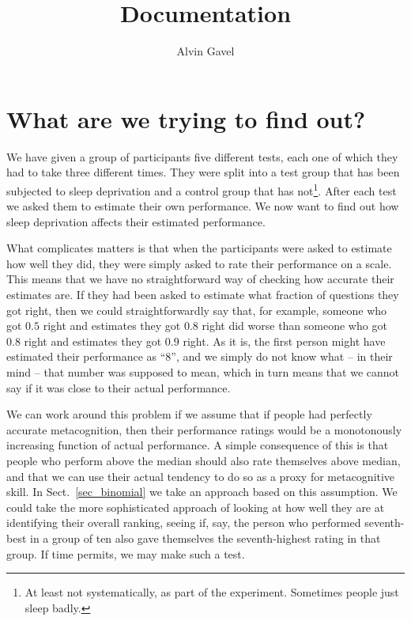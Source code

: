 \documentclass[10pt, twoside,a4paper]{article}
\title{Documentation}
\author{Alvin Gavel}
\date{}
\begin{document}
\maketitle

\tableofcontents

\newpage
\section{What are we trying to find out?}
We have given a group of participants five different tests, each one of which they had to take three different times. They were split into a test group that has been subjected to sleep deprivation and a control group that has not\footnote{At least not systematically, as part of the experiment. Sometimes people just sleep badly.}. After each test we asked them to estimate their own performance. We now want to find out how sleep deprivation affects their estimated performance.

What complicates matters is that when the participants were asked to estimate how well they did, they were simply asked to rate their performance on a scale. This means that we have no straightforward way of checking how accurate their estimates are. If they had been asked to estimate what fraction of questions they got right, then we could straightforwardly say that, for example, someone who got $0.5$ right and estimates they got $0.8$ right did worse than someone who got $0.8$ right and estimates they got $0.9$ right. As it is, the first person might have estimated their performance as ``8'', and we simply do not know what -- in their mind -- that number was supposed to mean, which in turn means that we cannot say if it was close to their actual performance.

We can work around this problem if we assume that if people had perfectly accurate metacognition, then their performance ratings would be a monotonously increasing function of actual performance. A simple consequence of this is that people who perform above the median should also rate themselves above median, and that we can use their actual tendency to do so as a proxy for metacognitive skill. In Sect.~\ref{sec_binomial} we take an approach based on this assumption. We could take the more sophisticated approach of looking at how well they are at identifying their overall ranking, seeing if, say, the person who performed seventh-best in a group of ten also gave themselves the seventh-highest rating in that group. If time permits, we may make such a test.
\end{document}
